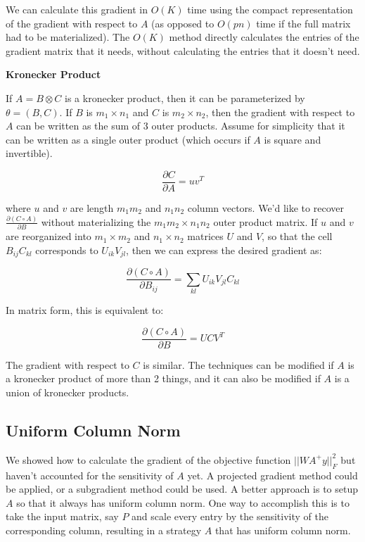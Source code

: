 \documentclass[12]{article}
\begin{document}
We can calculate this gradient in $O(K)$ time using the compact representation of the gradient with respect to $A$ (as opposed to $O(p n)$ time if the full matrix had to be materialized).  The $O(K)$ method directly calculates the entries of the gradient matrix that it needs, without calculating the entries that it doesn't need.


\textbf{Kronecker Product}

If $A = B \otimes C $ is a kronecker product, then it can be parameterized by $ \theta = (B,C) $.  If $B$ is $m_1 \times n_1$ and $C$ is $m_2 \times n_2$, then the gradient with respect to $A$ can be written as the sum of 3 outer products.  Assume for simplicity that it can be written as a single outer product (which occurs if $A$ is square and invertible).

$$ \frac{\partial C}{\partial A} = u v^T $$ 

where $u$ and $v$ are length $m_1 m_2$ and $n_1 n_2$ column vectors.  We'd like to recover $ \frac{\partial (C \circ A)}{\partial B} $ without materializing the $m_1 m_2 \times n_1 n_2 $ outer product matrix.  If $u$ and $v$ are reorganized into $m_1 \times m_2 $ and $n_1 \times n_2 $ matrices $U$ and $V$, so that the cell $ B_{ij} C_{kl} $ corresponds to $ U_{ik} V_{jl} $, then we can express the desired gradient as:

$$ \frac{\partial (C \circ A)}{\partial B_{ij}} = \sum_{kl} U_{ik} V_{jl} C_{kl} $$

In matrix form, this is equivalent to:

$$ \frac{\partial (C \circ A)}{\partial B} = U C V^T $$

The gradient with respect to $C$ is similar.  The techniques can be modified if $A$ is a kronecker product of more than 2 things, and it can also be modified if $A$ is a union of kronecker products.  

\subsection{Uniform Column Norm}

We showed how to calculate the gradient of the objective function $ || W A^+ y ||_F^2 $ but haven't accounted for the sensitivity of $A$ yet.  A projected gradient method could be applied, or a subgradient method could be used.  A better approach is to setup $A$ so that it always has uniform column norm.  One way to accomplish this is to take the input matrix, say $P$ and scale every entry by the sensitivity of the corresponding column, resulting in a strategy $A$ that has uniform column norm.  
\end{document}
